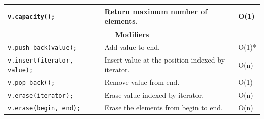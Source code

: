 \documentclass[12 pt, twoside] {article}
\begin{document}
{\begin{table}[h]
\begin{tabular}{|l|l|l|}
\texttt{v.capacity();}                               & Return maximum number of elements.                      & O(1)             \\ \hline
\multicolumn{3}{|c|}{\textbf{Modifiers}}                                                                                 \\ \hline
\texttt{v.push\_back(value);}                        & Add value to end.                                       & O(1)*  \\ \hline
\texttt{v.insert(iterator, value);}                  & Insert value at the position indexed by iterator.       & O(n)             \\ \hline
\texttt{v.pop\_back();}                              & Remove value from end.                                  & O(1)             \\ \hline
\texttt{v.erase(iterator);}                          & Erase value indexed by iterator.                        & O(n)             \\ \hline
\texttt{v.erase(begin, end);}                        & Erase the elements from begin to end.                   & O(n)             \\ \hline
\end{tabular}
\end{table}

}
\end{document}
